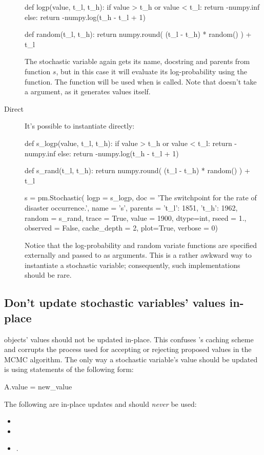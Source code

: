 \documentclass[]{jss}
\begin{document}
\begin{description}
\begin{CodeInput}
def logp(value, t_l, t_h):
    if value > t_h or value < t_l:
        return -numpy.inf
    else:
        return -numpy.log(t_h - t_l + 1)

def random(t_l, t_h):
    return numpy.round( (t_l - t_h) * random() ) + t_l

\end{CodeInput}
The stochastic variable again gets its name, docstring and parents from function $s$, but in this case it will evaluate its log-probability using the  function. The  function will be used when  is called. Note that  doesn't take a  argument, as it generates values itself.

    \item[Direct] It's possible to instantiate  directly:
\begin{CodeInput}
def s_logp(value, t_l, t_h):
if value > t_h or value < t_l:
    return -numpy.inf
else:
    return -numpy.log(t_h - t_l + 1)

def s_rand(t_l, t_h):
return numpy.round( (t_l - t_h) * random() ) + t_l

s = pm.Stochastic( logp = s_logp,
            doc = 'The switchpoint for the rate of disaster occurrence.',
            name = 's',
            parents = {'t_l': 1851, 't_h': 1962},
            random = s_rand,
            trace = True,
            value = 1900,
            dtype=int,
            rseed = 1.,
            observed = False,
            cache_depth = 2,
            plot=True,
            verbose = 0)
\end{CodeInput}
Notice that the log-probability and random variate functions are specified externally and passed to  as arguments. This is a rather awkward way to instantiate a stochastic variable; consequently, such implementations should be rare.

\end{description}

\subsection{Don't update stochastic variables' values in-place}


 objects' values should not be updated in-place. This confuses 's caching scheme and corrupts the process used for accepting or rejecting proposed values in the MCMC algorithm. The only way a stochastic variable's value should be updated is using statements of the following form:
\begin{CodeInput}
A.value = new_value
\end{CodeInput}
The following are in-place updates and should \emph{never} be used:
\begin{itemize}
    \item {}
    \item {}
    \item {}.
\end{itemize}
\end{document}
